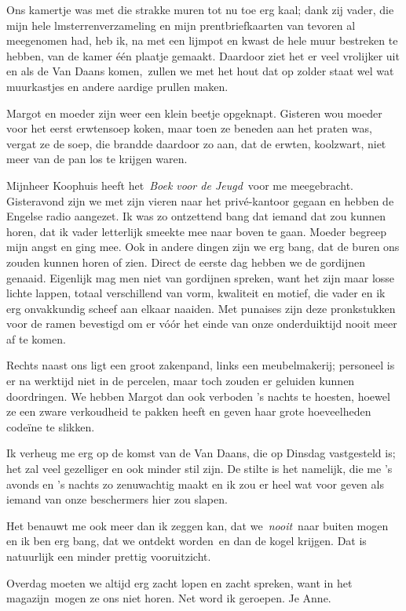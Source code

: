 \documentclass{book}
\begin{document}
Ons kamertje was met die strakke muren tot nu toe erg kaal; dank zij
vader, die mijn hele lmsterrenverzameling en mijn prentbriefkaarten van
tevoren al meegenomen had, heb ik, na met een lijmpot en kwast de hele
muur bestreken te hebben, van de kamer één plaatje gemaakt. Daardoor
ziet het er veel vrolijker uit en als de Van Daans komen,~zullen we met
het hout dat op zolder staat wel wat muurkastjes en andere aardige
prullen maken.

Margot en moeder zijn weer een klein beetje opgeknapt. Gisteren wou
moeder voor het eerst erwtensoep koken, maar toen ze beneden aan het
praten was, vergat ze de soep, die brandde daardoor zo aan, dat de
erwten, koolzwart, niet meer van de pan los te krijgen waren.

Mijnheer Koophuis heeft het~\emph{Boek voor de Jeugd}~voor me
meegebracht. Gisteravond zijn we met zijn vieren naar het privé-kantoor
gegaan en hebben de Engelse radio aangezet. Ik was zo ontzettend bang
dat iemand dat zou kunnen horen, dat ik vader letterlijk smeekte mee
naar boven te gaan. Moeder begreep mijn angst en ging mee. Ook in andere
dingen zijn we erg bang, dat de buren ons zouden kunnen horen of zien.
Direct de eerste dag hebben we de gordijnen genaaid. Eigenlijk mag men
niet van gordijnen spreken, want het zijn maar losse lichte lappen,
totaal verschillend van vorm, kwaliteit en motief, die vader en ik erg
onvakkundig scheef aan elkaar naaiden. Met punaises zijn deze
pronkstukken voor de ramen bevestigd om er vóór het einde van onze
onderduiktijd nooit meer af te komen.

Rechts naast ons ligt een groot zakenpand, links een meubelmakerij;
personeel is er na werktijd niet in de percelen, maar toch zouden er
geluiden kunnen doordringen. We hebben Margot dan ook verboden 's nachts
te hoesten, hoewel ze een zware verkoudheid te pakken heeft en geven
haar grote hoeveelheden codeïne te slikken.

Ik verheug me erg op de komst van de Van Daans, die op Dinsdag
vastgesteld is; het zal veel gezelliger en ook minder stil zijn. De
stilte is het namelijk, die me 's avonds en 's nachts zo zenuwachtig
maakt en ik zou er heel wat voor geven als iemand van onze beschermers
hier zou slapen.

Het benauwt me ook meer dan ik zeggen kan, dat we~\emph{nooit}~naar
buiten mogen en ik ben erg bang, dat we ontdekt worden~en dan de kogel
krijgen. Dat is natuurlijk een minder prettig vooruitzicht.

Overdag moeten we altijd erg zacht lopen en zacht spreken, want in het
magazijn~mogen ze ons niet horen. Net word ik geroepen. Je Anne.
\end{document}
